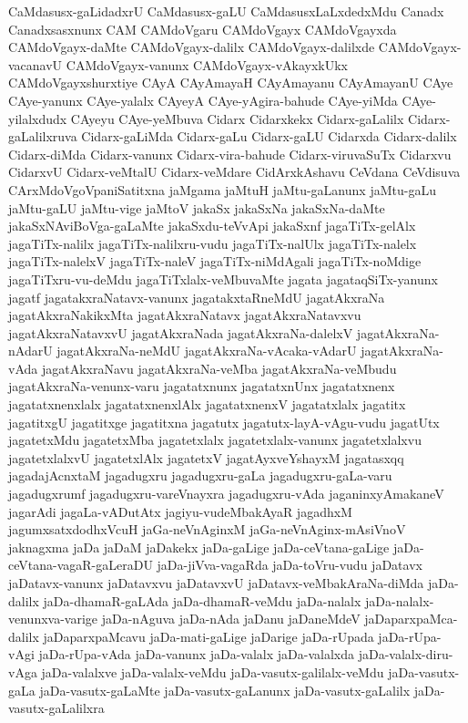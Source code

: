 {CaMdasusx-gaLidadxrU
CaMdasusx-gaLU
CaMdasusxLaLxdedxMdu
Canadx
Canadxsasxnunx
CAM
CAMdoVgaru
CAMdoVgayx
CAMdoVgayxda
CAMdoVgayx-daMte
CAMdoVgayx-dalilx
CAMdoVgayx-dalilxde
CAMdoVgayx-vacanavU
CAMdoVgayx-vanunx
CAMdoVgayx-vAkayxkUkx
CAMdoVgayxshurxtiye
CAyA
CAyAmayaH
CAyAmayanu
CAyAmayanU
CAye
CAye-yanunx
CAye-yalalx
CAyeyA
CAye-yAgira-bahude
CAye-yiMda
CAye-yilalxdudx
CAyeyu
CAye-yeMbuva
Cidarx
Cidarxkekx
Cidarx-gaLalilx
Cidarx-gaLalilxruva
Cidarx-gaLiMda
Cidarx-gaLu
Cidarx-gaLU
Cidarxda
Cidarx-dalilx
Cidarx-diMda
Cidarx-vanunx
Cidarx-vira-bahude
Cidarx-viruvaSuTx
Cidarxvu
CidarxvU
Cidarx-veMtalU
Cidarx-veMdare
CidArxkAshavu
CeVdana
CeVdisuva
CArxMdoVgoVpaniSatitxna
jaMgama
jaMtuH
jaMtu-gaLanunx
jaMtu-gaLu
jaMtu-gaLU
jaMtu-vige
jaMtoV
jakaSx
jakaSxNa
jakaSxNa-daMte
jakaSxNAviBoVga-gaLaMte
jakaSxdu-teVvApi
jakaSxnf
jagaTiTx-gelAlx
jagaTiTx-nalilx
jagaTiTx-nalilxru-vudu
jagaTiTx-nalUlx
jagaTiTx-nalelx
jagaTiTx-nalelxV
jagaTiTx-naleV
jagaTiTx-niMdAgali
jagaTiTx-noMdige
jagaTiTxru-vu-deMdu
jagaTiTxlalx-veMbuvaMte
jagata
jagataqSiTx-yanunx
jagatf
jagatakxraNatavx-vanunx
jagatakxtaRneMdU
jagatAkxraNa
jagatAkxraNakikxMta
jagatAkxraNatavx
jagatAkxraNatavxvu
jagatAkxraNatavxvU
jagatAkxraNada
jagatAkxraNa-dalelxV
jagatAkxraNa-nAdarU
jagatAkxraNa-neMdU
jagatAkxraNa-vAcaka-vAdarU
jagatAkxraNa-vAda
jagatAkxraNavu
jagatAkxraNa-veMba
jagatAkxraNa-veMbudu
jagatAkxraNa-venunx-varu
jagatatxnunx
jagatatxnUnx
jagatatxnenx
jagatatxnenxlalx
jagatatxnenxlAlx
jagatatxnenxV
jagatatxlalx
jagatitx
jagatitxgU
jagatitxge
jagatitxna
jagatutx
jagatutx-layA-vAgu-vudu
jagatUtx
jagatetxMdu
jagatetxMba
jagatetxlalx
jagatetxlalx-vanunx
jagatetxlalxvu
jagatetxlalxvU
jagatetxlAlx
jagatetxV
jagatAyxveYshayxM
jagatasxqq
jagadajAcnxtaM
jagadugxru
jagadugxru-gaLa
jagadugxru-gaLa-varu
jagadugxrumf
jagadugxru-vareVnayxra
jagadugxru-vAda
jaganinxyAmakaneV
jagarAdi
jagaLa-vADutAtx
jagiyu-vudeMbakAyaR
jagadhxM
jagumxsatxdodhxVcuH
jaGa-neVnAginxM
jaGa-neVnAginx-mAsiVnoV
jaknagxma
jaDa
jaDaM
jaDakekx
jaDa-gaLige
jaDa-ceVtana-gaLige
jaDa-ceVtana-vagaR-gaLeraDU
jaDa-jiVva-vagaRda
jaDa-toVru-vudu
jaDatavx
jaDatavx-vanunx
jaDatavxvu
jaDatavxvU
jaDatavx-veMbakAraNa-diMda
jaDa-dalilx
jaDa-dhamaR-gaLAda
jaDa-dhamaR-veMdu
jaDa-nalalx
jaDa-nalalx-venunxva-varige
jaDa-nAguva
jaDa-nAda
jaDanu
jaDaneMdeV
jaDaparxpaMca-dalilx
jaDaparxpaMcavu
jaDa-mati-gaLige
jaDarige
jaDa-rUpada
jaDa-rUpa-vAgi
jaDa-rUpa-vAda
jaDa-vanunx
jaDa-valalx
jaDa-valalxda
jaDa-valalx-diru-vAga
jaDa-valalxve
jaDa-valalx-veMdu
jaDa-vasutx-galilalx-veMdu
jaDa-vasutx-gaLa
jaDa-vasutx-gaLaMte
jaDa-vasutx-gaLanunx
jaDa-vasutx-gaLalilx
jaDa-vasutx-gaLalilxra
}
